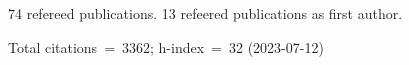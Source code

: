 74 refereed publications. 13 refeered publications as first author.

Total citations~=~3362; h-index~=~32 (2023-07-12)